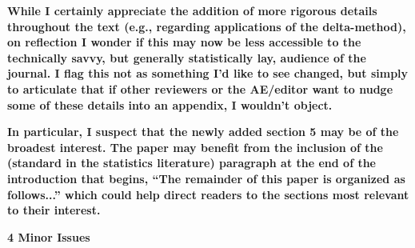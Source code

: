 \documentclass[docs/main.tex]{subfiles}
\newcommand{\reviewercomment}[1]{\vspace{0.3cm}\noindent\textbf{#1}\vspace{0.15cm}}
\begin{document}
\reviewercomment{While I certainly appreciate the addition of more rigorous details throughout the text (e.g., regarding applications of the delta-method), on reflection I wonder if this may now be less accessible to the technically savvy, but generally statistically lay, audience of the journal. I flag this not as something I'd like to see changed, but simply to articulate that if other reviewers or the AE/editor want to nudge some of these details into an appendix, I wouldn't object.}

\reviewercomment{In particular, I suspect that the newly added section 5 may be of the broadest interest. The paper may benefit from the inclusion of the (standard in the statistics literature) paragraph at the end of the introduction that begins, ``The remainder of this paper is organized as follows...'' which could help direct readers to the sections most relevant to their interest.}

\textbf{4 Minor Issues}

\reviewercomment{}
\end{document}
